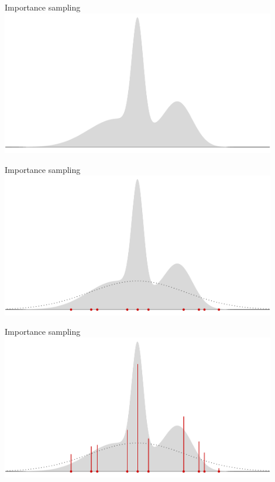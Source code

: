 \documentclass[aspectratio=169]{beamer}
\theoremstyle{definition}
\begin{document}
\begin{frame}{Importance sampling}
\centering
\includegraphics[width=0.9\textwidth]{importance1.pdf}

\end{frame}

\begin{frame}{Importance sampling}
\centering
\includegraphics[width=0.9\textwidth]{importance2.pdf}

\end{frame}

\begin{frame}{Importance sampling}
\centering
\includegraphics[width=0.9\textwidth]{importance3.pdf}

\end{frame}
\end{document}
